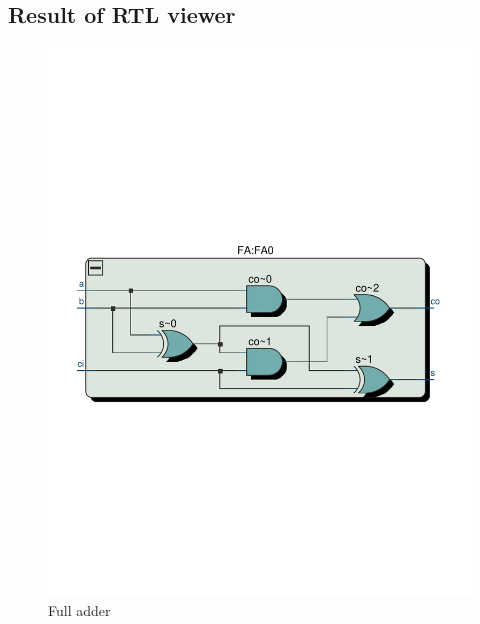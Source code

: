 \documentclass[13pt,a4paper]{report}
\begin{document}
\subsection{Result of RTL viewer}
\begin{figure}[H]
\centering
\includegraphics[scale=0.5, clip, trim={0cm 10cm 0cm 10.6cm}]{images/Exc1_FA_RTL.pdf}
\caption*{Full adder}
\end{figure}
\end{document}
